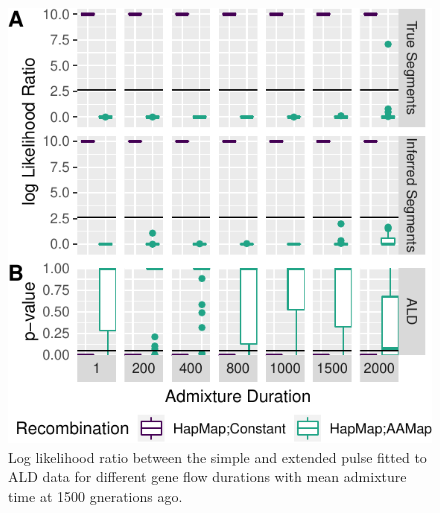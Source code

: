 \documentclass[11pt]{article}
\begin{document}
\begin{figure}
\centering
\includegraphics{ATE_Revisions_files/figure-latex/figResult3_3_supplements-1.pdf}
\caption{\label{fig:figResult3_3_supplements} Log likelihood ratio between the simple and extended pulse fitted to ALD data for different gene flow durations with mean admixture time at 1500 gnerations ago.}
\end{figure}
\end{document}
